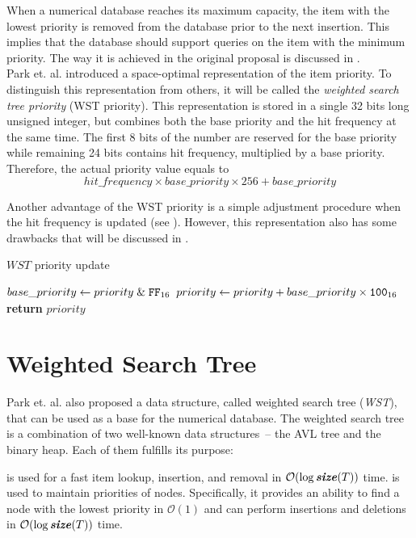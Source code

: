 When a numerical database reaches its maximum capacity, the item with the lowest priority is removed from the database prior to the next insertion. This implies that the database should support queries on the item with the minimum priority. The way it is achieved in the original proposal is discussed in .
\\

Park et. al. introduced a space-optimal representation of the item priority. To distinguish this representation from others, it will be called the \emph{weighted search tree priority} (WST priority). This representation is stored in a single 32 bits long unsigned integer, but combines both the base priority and the hit frequency at the same time. The first 8 bits of the number are reserved for the base priority while remaining 24 bits contains hit frequency, multiplied by a base priority.
Therefore, the actual priority value equals to
\begin{equation}
hit\_frequency \times base\_priority \times 256 + base\_priority
\end{equation}

Another advantage of the WST priority is a simple adjustment procedure when the hit frequency is updated (see ). However, this representation also has some drawbacks that will be discussed in .
\begin{algorithm}[t]
\caption{$WST$ priority update}\label{alg:wst_priority1}
\begin{algorithmic}[1]
    \State $base\_priority\gets priority \mathrel{\&} \texttt{FF}_{16}$
    \State $priority \gets priority + base\_priority \times \texttt{100}_{16}$
    \State {}
    \State \textbf{return} $priority$
  \EndProcedure
\end{algorithmic}
\end{algorithm}

\section{Weighted Search Tree}
\label{sec:wst}
Park et. al. also proposed a data structure, called weighted search tree (\emph{WST}), that can be used as a base for the numerical database. The weighted search tree is a combination of two well-known data structures~-- the AVL tree and the binary heap. Each of them fulfills its purpose:
\begin{block-description}
 is used for a fast item lookup, insertion, and removal in $\mathcal{O}(\log{\ensuremath{\textbf{\textit{size}}(T)}})$ time.
 is used to maintain priorities of nodes. Specifically, it provides an ability to find a node with the lowest priority in $\mathcal{O}(1)$ and can perform insertions and deletions in $\mathcal{O}(\log{\ensuremath{\textbf{\textit{size}}(T)}})$ time.
\end{block-description}

